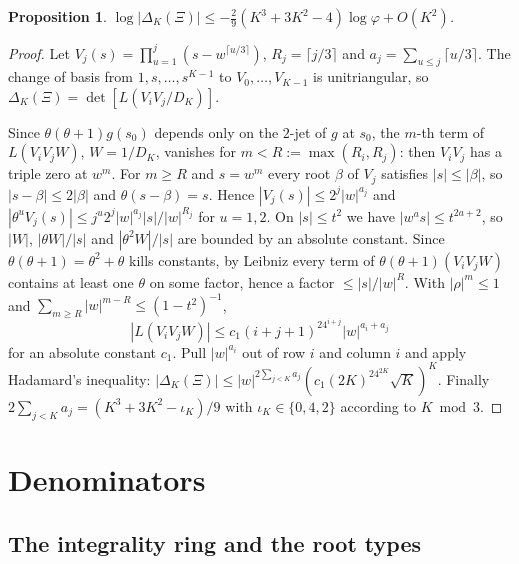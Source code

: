 \documentclass[11pt]{amsart}
\newtheorem{proposition}[theorem]{Proposition}
\theoremstyle{definition}
\theoremstyle{remark}
\numberwithin{equation}{section}
\begin{document}
\begin{proposition}\label{prop:decay}
$\log|\Delta_K(\Xi)|\le-\tfrac29(K^3+3K^2-4)\log\varphi+O(K^2)$.
\end{proposition}
\begin{proof}
Let $V_j(s)=\prod_{u=1}^j(s-w^{\lceil u/3\rceil})$, $R_j=\lceil j/3\rceil$ and $a_j=\sum_{u\le j}\lceil u/3\rceil$.
The change of basis from $1,s,\dots,s^{K-1}$ to $V_0,\dots,V_{K-1}$ is unitriangular, so
$\Delta_K(\Xi)=\det[L(V_iV_j/D_K)]$.

Since $\theta(\theta+1)g(s_0)$ depends only on the $2$-jet of $g$ at $s_0$, the $m$-th term of $L(V_iV_jW)$,
$W=1/D_K$, vanishes for $m<R:=\max(R_i,R_j)$: then $V_iV_j$ has a triple zero at $w^m$. For $m\ge R$ and $s=w^m$ every
root $\beta$ of $V_j$ satisfies $|s|\le|\beta|$, so $|s-\beta|\le2|\beta|$ and $\theta(s-\beta)=s$. Hence
$|V_j(s)|\le2^j|w|^{a_j}$ and $|\theta^uV_j(s)|\le j^u2^j|w|^{a_j}|s|/|w|^{R_j}$ for $u=1,2$. On $|s|\le t^2$ we have
$|w^as|\le t^{2a+2}$, so $|W|$, $|\theta W|/|s|$ and $|\theta^2W|/|s|$ are bounded by an absolute constant. Since
$\theta(\theta+1)=\theta^2+\theta$ kills constants, by Leibniz every term of $\theta(\theta+1)(V_iV_jW)$ contains at
least one $\theta$ on some factor, hence a factor $\le|s|/|w|^R$. With $|\rho|^m\le1$ and
$\sum_{m\ge R}|w|^{m-R}\le(1-t^2)^{-1}$,
\[
|L(V_iV_jW)|\le c_1(i+j+1)^24^{i+j}|w|^{a_i+a_j}
\]
for an absolute constant $c_1$. Pull $|w|^{a_i}$ out of row $i$ and column $i$ and apply Hadamard's inequality:
$|\Delta_K(\Xi)|\le|w|^{2\sum_{j<K}a_j}(c_1(2K)^24^{2K}\sqrt K)^K$. Finally
$2\sum_{j<K}a_j=(K^3+3K^2-\iota_K)/9$ with $\iota_K\in\{0,4,2\}$ according to $K\bmod3$.
\end{proof}

\section{Denominators}\label{sec:den}

\subsection{The integrality ring and the root types}
\end{document}
